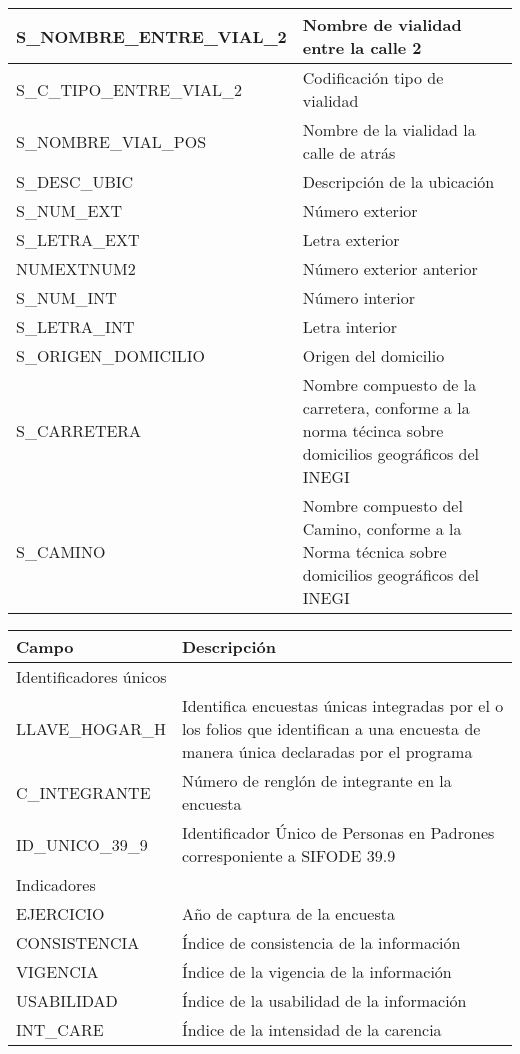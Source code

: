 \begin{longtable}{|p{8cm}|p{8cm}|}
    \hline
    S\_NOMBRE\_ENTRE\_VIAL\_2 & Nombre de vialidad entre la calle 2 \\
    \hline
    S\_C\_TIPO\_ENTRE\_VIAL\_2 & Codificación tipo de vialidad \\
    \hline
    S\_NOMBRE\_VIAL\_POS & Nombre de la vialidad la calle de atrás \\
    \hline
    S\_DESC\_UBIC & Descripción de la ubicación \\
    \hline
    S\_NUM\_EXT & Número exterior \\
    \hline
    S\_LETRA\_EXT & Letra exterior \\
    \hline
    NUMEXTNUM2 & Número exterior anterior \\
    \hline
    S\_NUM\_INT & Número interior \\
    \hline
    S\_LETRA\_INT & Letra interior \\
    \hline
    S\_ORIGEN\_DOMICILIO & Origen del domicilio \\
    \hline
    S\_CARRETERA & Nombre compuesto de la carretera, conforme a la norma técinca sobre domicilios geográficos del INEGI \\
    \hline
    S\_CAMINO & Nombre compuesto del Camino, conforme a la Norma técnica sobre domicilios geográficos del INEGI \\
    \hline
\end{longtable}
\caption{Información domiciliaria de SIFODE 39.9}
\label{tab:domicilios}

\pagebreak

\begin{longtable}{|p{8cm}|p{8cm}|}
    \hline
    \hline
    Campo  & Descripción\\
    \hline
    \multicolumn{2}{l}{Identificadores únicos}\\
    \hline
    LLAVE\_HOGAR\_H & Identifica encuestas únicas integradas por el o los folios que identifican a una encuesta de manera única declaradas por el programa\\
    \hline
    C\_INTEGRANTE & Número de renglón de integrante en la encuesta\\
    \hline
    ID\_UNICO\_39\_9 & Identificador Único de Personas en Padrones corresponiente a SIFODE 39.9\\
    \hline
    \hline
    \multicolumn{2}{l}{Indicadores}\\
    \hline
    EJERCICIO & Año de captura de la encuesta \\
    \hline
    CONSISTENCIA & Índice de consistencia de la información \\
    \hline
    VIGENCIA & Índice de la vigencia de la información \\
    \hline
    USABILIDAD & Índice de la usabilidad de la información \\
    \hline
    INT\_CARE & Índice de la intensidad de la carencia \\
    \hline
\end{longtable}
\caption{Información de los indicadores de SIFODE 39.9}
\label{tab:indicadores}

